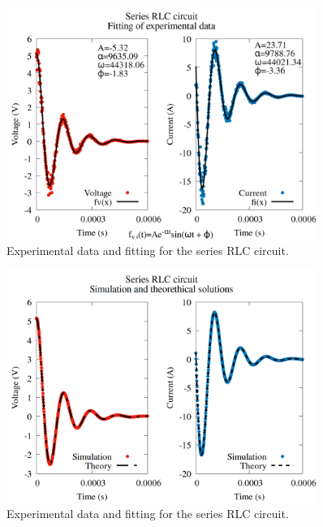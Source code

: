 \documentclass[12pt,twoside]{extarticle}
\begin{document}
\begin{figure}[ht]
    \centering
    \includegraphics[width=0.9\textwidth]{figures/series_exp_vs_fitting.png}
    \caption{Experimental data and fitting for the series RLC circuit.}
    \label{fig:series_evf}
\end{figure}

\begin{figure}[ht]
    \centering
    \includegraphics[width=0.9\textwidth]{figures/series_sim_vs_ana.png}
    \caption{Experimental data and fitting for the series RLC circuit.}
\label{fig:series_sva}
\end{figure}
\end{document}
